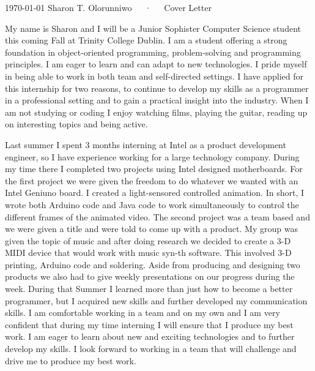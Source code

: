 \documentclass[11pt, a4paper]{awesome-cv}
\begin{document}
\makecvheader[R]

\makecvfooter
  {\today}
  {Sharon T. Olorunniwo~~~·~~~Cover Letter}
  {}

\makelettertitle

\begin{cvletter}

My name is Sharon and I will be a Junior Sophister Computer Science student this coming Fall at Trinity College Dublin. I am a student offering a strong foundation in object-oriented programming, problem-solving and programming principles. I am eager to learn and can adapt to new technologies. I pride myself in being able to work in both team and self-directed settings. I have applied for this internship for two reasons, to continue to develop my skills as a programmer in a professional setting and to gain a practical insight into the industry. When I am not studying or coding I enjoy watching films, playing the guitar, reading up on interesting topics and being active.

Last summer I spent 3 months interning at Intel as a product development engineer, so I have experience working for a large technology company. During my time there I completed two projects using Intel designed motherboards. For the first project we were given the freedom to do whatever we wanted with an Intel Geniuno board. I created a light-sensored controlled animation. In short, I wrote both Arduino code and Java code to work simultaneously to control the different frames of the animated video. The second project was a team based and we were given a title and were told to come up with a product. My group was given the topic of music and after doing research we decided to create a 3-D MIDI device that would work with music syn-th software. This involved 3-D printing, Arduino code and soldering.  
Aside from producing and designing two products we also had to give weekly presentations on our progress during the week. During that Summer I learned more than just how to become a better programmer, but I acquired new skills and further developed my communication skills.  
I am comfortable working in a team and on my own and I am very confident that during my time interning I will ensure that I produce my best work. I am eager to learn about new and exciting technologies and to further develop my skills. I look forward to working in a team that will challenge and drive me to produce my best work.


\end{cvletter}
\end{document}
